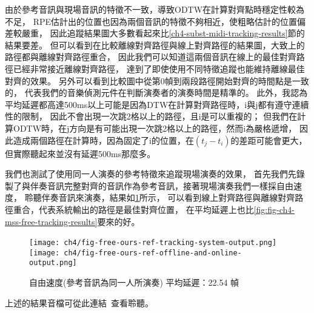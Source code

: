 \documentclass[class=NCU_thesis, crop=false]{standalone}
\begin{document}
由於參考音訊與現場音訊的特徵不一致，導致ODTW在計算對齊點時穩定性較為不足，
RPE估計出的位置也因為兩個音訊的特徵不夠相近，使粗略估計的位置偏差較嚴重，
因此追蹤結果圖大多數看起來比\ref{ch4-subst-midi-tracking-results}節的結果要差。
但可以看到在比較離線對齊路徑與線上對齊路徑的結果圖，大致上的路徑都與離線對齊路徑重合，
因此我們可以知道這兩個音訊在線上的最佳對齊路徑已經非常接近離線對齊路徑，
達到了即使使用不同特徵追蹤也能維持離線最佳對齊的效果。
另外可以看到比較圖中從第0幀到兩段路徑開始對齊的時間點是一致的，
代表我們的音樂偵測元件在判斷演奏者的演奏時間是精準的。
此外，我認為平均延遲都高達500ms以上可能是因為DTW在計算對齊路徑時，i與j都有遵守連續性的限制，
因此不會出現一次跳2格以上的路徑，且i是可以重複的；
但我們在計算ODTW時，在j方向是有可能出現一次跳2格以上的路徑，然而i為嚴格遞增，
因此造成兩個路徑在計算時，因為固定了i的位置，在$(t_j-t_i)$的差距可能會更大，
但實際聽起來並沒有延遲500ms那麼多。

我們也測試了使用同一人演奏的參考特徵來追蹤現場演奏的效果，
首先我們先錄製了與伴奏音訊完整對齊的音訊作為參考音訊，接著現場演奏我們一樣採自由速度，
聆聽伴奏音訊來演奏，結果如\cref{fig:fig-ch4-free-ours-ref-tracking-results}所示，
可以看到線上對齊路徑與離線對齊路徑重合，代表系統輸出的路徑是最佳對齊位置，
在平均延遲上也比\cref{fig:fig-ch4-mss-free-tracking-results}要來的好。

\begin{figure}[H]
    \centering
    \subcaptionbox
    {
    \label{fig:free-ours-ref-tracking-output}}
    {\texttt{[image: ch4/fig-free-ours-ref-tracking-system-output.png]}}
    ~
    \subcaptionbox
    {
    \label{fig:free-ours-ref-comparision-output}}
    {\texttt{[image: ch4/fig-free-ours-ref-offline-and-online-output.png]}}
    \caption{自由速度(參考音訊為同一人所演奏) 平均延遲：22.54 幀}
    \label{fig:fig-ch4-free-ours-ref-tracking-results}
\end{figure}



上述的結果音檔可從此連結~\cite{YuJieLin2024DiffFeatureTrackingResults}查看聆聽。

\pagebreak
\end{document}
